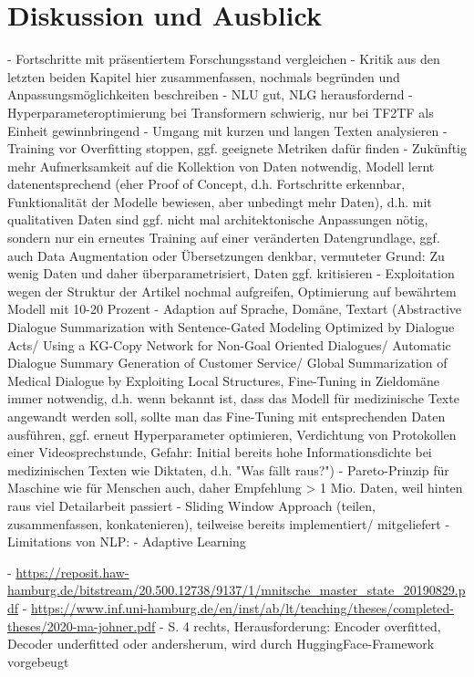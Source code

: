 \chapter{Diskussion und Ausblick}
\thispagestyle{fancy}
\label{chap:Diskussion und Ausblick}

- Fortschritte mit präsentiertem Forschungsstand vergleichen
- Kritik aus den letzten beiden Kapitel hier zusammenfassen, nochmals begründen und Anpassungsmöglichkeiten beschreiben
- NLU gut, NLG herausfordernd
- Hyperparameteroptimierung bei Transformern schwierig, nur bei TF2TF als Einheit gewinnbringend
- Umgang mit kurzen und langen Texten analysieren
- Training vor Overfitting stoppen, ggf. geeignete Metriken dafür finden
- Zukünftig mehr Aufmerksamkeit auf die Kollektion von Daten notwendig, Modell lernt datenentsprechend (eher Proof of Concept, d.h. Fortschritte erkennbar, Funktionalität der Modelle bewiesen, aber unbedingt mehr Daten), d.h. mit qualitativen Daten sind ggf. nicht mal architektonische Anpassungen nötig, sondern nur ein erneutes Training auf einer veränderten Datengrundlage, ggf. auch Data Augmentation oder Übersetzungen denkbar, vermuteter Grund: Zu wenig Daten und daher überparametrisiert, Daten ggf. kritisieren
- Exploitation wegen der Struktur der Artikel nochmal aufgreifen, Optimierung auf bewährtem Modell mit 10-20 Prozent
- Adaption auf Sprache, Domäne, Textart (Abstractive Dialogue Summarization with Sentence-Gated Modeling Optimized by Dialogue Acts/ Using a KG-Copy Network for Non-Goal Oriented Dialogues/ Automatic Dialogue Summary Generation of Customer Service/ Global Summarization of Medical Dialogue by Exploiting Local Structures, Fine-Tuning in Zieldomäne immer notwendig, d.h. wenn bekannt ist, dass das Modell für medizinische Texte angewandt werden soll, sollte man das Fine-Tuning mit entsprechenden Daten ausführen, ggf. erneut Hyperparameter optimieren, Verdichtung von Protokollen einer Videosprechstunde, Gefahr: Initial bereits hohe Informationsdichte bei medizinischen Texten wie Diktaten, d.h. "Was fällt raus?")
- Pareto-Prinzip für Maschine wie für Menschen auch, daher Empfehlung > 1 Mio. Daten, weil hinten raus viel Detailarbeit passiert
- Sliding Window Approach (teilen, zusammenfassen, konkatenieren), teilweise bereits implementiert/ mitgeliefert
- Limitations von NLP: \cite[S.~30-31]{BIR09}
- Adaptive Learning

- \url{https://reposit.haw-hamburg.de/bitstream/20.500.12738/9137/1/mnitsche_master_state_20190829.pdf}
- \url{https://www.inf.uni-hamburg.de/en/inst/ab/lt/teaching/theses/completed-theses/2020-ma-johner.pdf}
- \cite{YAN19} S. 4 rechts, Herausforderung: Encoder overfitted, Decoder underfitted oder andersherum, wird durch HuggingFace-Framework vorgebeugt
